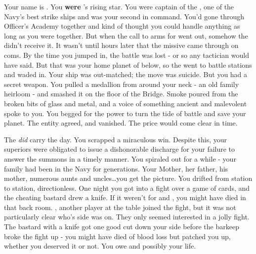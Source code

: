 \documentclass[char]{TMFHope}
\begin{document}
\name{\cCap{}}

Your name is \cCap{}. You {\bf were} \pTMN{}'s rising star. You were captain of the \pOld{}, one of the Navy's best strike ships and \cXO{} was your second in command. You'd gone through Officer's Academy together and kind of thought you could handle anything as long as you were together. But when the call to arms for went out, somehow the \pOld{} didn't receive it. It wasn't until hours later that the  missive came through on coms. By the time you jumped in, the battle was lost - or so any tactician would have said. But that was your home planet of \pHome{} below, so the \pOld{} went to battle stations and waded in. Your ship was out-matched; the move was suicide. But you had a secret weapon. You pulled a medallion from around your neck - an old family heirloom - and smashed it on the floor of the Bridge. Smoke poured from the broken bits of glass and metal, and a voice of something ancient and malevolent spoke to you. You begged for the power to turn the tide of battle and save your planet. The entity agreed, and vanished. The price would come clear in time.

The \pOld{} \emph{did} carry the day. You scrapped a miraculous win. Despite this, your superiors were obligated to issue a dishonorable discharge for your failure to answer the summons in a timely manner. You spiraled out for a while - your family had been in the Navy for generations. Your Mother, her father, his mother, numerous aunts and uncles\ldots you get the picture. You drifted from station to station, directionless. One night you got into a fight over a game of cards, and the cheating bastard drew a knife. If it weren't for \cSci{} and \cMed{}, you might have died in that back room. \cSci{}, another player at the table joined the fight, but it was not particularly clear who's side \cSci{\they} was on. They only seemed interested in a jolly fight. The bastard with a knife got one good cut down your side before the barkeep broke the fight up - you might have died of blood loss but \cMed{} patched you up, whether you deserved it or not. You owe \cMed{} and possibly \cSci{} your life.
\end{document}
